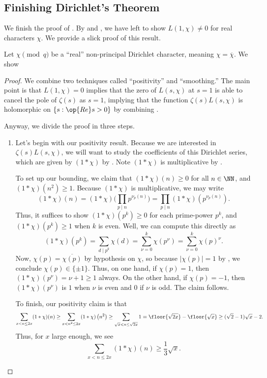 \documentclass[../notes.tex]{subfiles}
\begin{document}
\subsection{Finishing Dirichlet's Theorem}
We finish the proof of . By  and , we have left to show $L(1,\chi)\ne0$ for real characters $\chi$. We provide a slick proof of this result.
\begin{lemma}
	Let $\chi\pmod q$ be a ``real'' non-principal Dirichlet character, meaning $\chi=\overline\chi$. We show 
\end{lemma}
\begin{proof}
	We combine two techniques called ``positivity'' and ``smoothing.'' The main point is that $L(1,\chi)=0$ implies that the zero of $L(s,\chi)$ at $s=1$ is able to cancel the pole of $\zeta(s)$ as $s=1$, implying that the function $\zeta(s)L(s,\chi)$ is holomorphic on $\{s:\op{Re}s>0\}$ by combining .

	Anyway, we divide the proof in three steps.
	\begin{enumerate}
		\item Let's begin with our positivity result. Because we are interested in $\zeta(s)L(s,\chi)$, we will want to study the coefficients of this Dirichlet series, which are given by $(1*\chi)$ by . Note $(1*\chi)$ is multiplicative by .

		To set up our bounding, we claim that $(1*\chi)(n)\ge0$ for all $n\in\NN$, and $(1*\chi)\left(n^2\right)\ge1$. Because $(1*\chi)$ is multiplicative, we may write
		\[(1*\chi)(n)=(1*\chi)\Bigg(\prod_{p\mid n}p^{\nu_p(n)}\Bigg)=\prod_{p\mid n}(1*\chi)\left(p^{\nu_p(n)}\right).\]
		Thus, it suffices to show $(1*\chi)\left(p^k\right)\ge0$ for each prime-power $p^k$, and $(1*\chi)\left(p^k\right)\ge1$ when $k$ is even. Well, we can compute this directly as
		\[(1*\chi)\left(p^k\right)=\sum_{d\mid p^k}\chi(d)=\sum_{\nu=0}^k\chi\left(p^\nu\right)=\sum_{\nu=0}^k\chi(p)^\nu.\]
		Now, $\chi(p)=\overline{\chi(p)}$ by hypothesis on $\chi$, so because $|\chi(p)|=1$ by , we conclude $\chi(p)\in\{\pm1\}$. Thus, on one hand, if $\chi(p)=1$, then $(1*\chi)\left(p^\nu\right)=\nu+1\ge1$ always. On the other hand, if $\chi(p)=-1$, then $(1*\chi)\left(p^\nu\right)$ is $1$ when $\nu$ is even and $0$ if $\nu$ is odd. The claim follows.
	
		To finish, our positivity claim is that
		\[\sum_{x<n\le2x}(1*\chi)(n)\ge\sum_{x<n^2\le2x}(1*\chi)\left(n^2\right)\ge\sum_{\sqrt x<n\le\sqrt{2x}}1=\floor{\sqrt{2x}}-\floor{\sqrt x}\ge(\sqrt2-1)\sqrt x-2.\]
		Thus, for $x$ large enough, we see
		\[\sum_{x<n\le2x}(1*\chi)(n)\ge\frac13\sqrt x.\]


\end{enumerate}
\end{proof}
\end{document}
